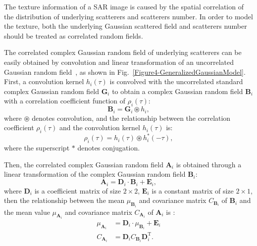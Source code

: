 \documentclass[journal]{IEEEtran}
\begin{document}
The texture information of a SAR image is caused by the spatial correlation of the distribution of underlying scatterers and scatterers number.
In order to model the texture, both the underlying Gaussian scattered field and scatterers number should be treated as correlated random fields.

The correlated complex Gaussian random field of underlying scatterers can be easily obtained by convolution and linear transformation of an uncorrelated Gaussian random field~\cite{Bustos:2009}, as shown in Fig.~\ref{Figure4-GeneralizedGaussianModel}.
First, a convolution kernel $h_{i}(\tau)$ is convolved with the uncorrelated standard complex Gaussian random field $\boldsymbol{G}_{i}$ to obtain a complex Gaussian random field $\boldsymbol{B}_{i}$ with a correlation coefficient function of $\rho_{i}(\tau)$:
\begin{equation}
\boldsymbol{B}_{i} = \boldsymbol{G}_{i} \circledast h_{i},
\label{eq10}
\end{equation}
where $\circledast$ denotes convolution, and the relationship between the correlation coefficient $\rho_{i}(\tau)$ and the convolution kernel $h_{i}(\tau)$ is:
\begin{equation}
\rho_{i}(\tau)=h_{i}(\tau) \circledast h_{i}^{*}(-\tau),
\label{eq11}
\end{equation}
where the superscript $*$ denotes conjugation.

Then, the correlated complex Gaussian random field $\boldsymbol{A}_{i}$ is obtained through a linear transformation of the complex Gaussian random field $\boldsymbol{B}_{i}$:
\begin{equation}
\boldsymbol{A}_{i}=\mathbf{D}_{i} \cdot \boldsymbol{B}_{i}+\mathbf{E}_{i},
\label{eq12}
\end{equation}
where $\mathbf{D}_{i}$ is a coefficient matrix of size $2 \times 2$, $\mathbf{E}_{i}$ is a constant matrix of size $2 \times 1$, then the relationship between the mean $\mu_{\boldsymbol{B}_{i}}$ and covariance matrix $C_{\boldsymbol{B}_{i}}$ of $\boldsymbol{B}_{i}$ and the mean value $\mu_{\boldsymbol{A}_{i}}$ and covariance matrix $C_{\boldsymbol{A}_{i}}$ of $\boldsymbol{A}_{i}$ is \cite{Conte:1987}:
\begin{equation}
\begin{split}
\mu_{\boldsymbol{A}_{i}} & = \mathbf{D}_{i} \cdot \mu_{\boldsymbol{B}_{i}}+\mathbf{E}_{i} \\
C_{\boldsymbol{A}_{i}} & = \mathbf{D}_{i} C_{\boldsymbol{B}_{i}} \mathbf{D}_{i}^{\mathrm{T}}.
\label{eq13}
\end{split}
\end{equation}
\end{document}
